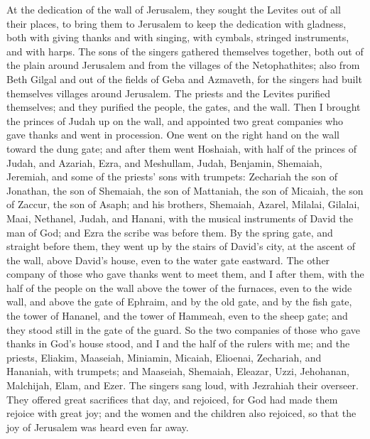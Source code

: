  At the dedication of the wall of Jerusalem, they sought
the Levites out of all their places, to bring them to Jerusalem to keep
the dedication with gladness, both with giving thanks and with singing,
with cymbals, stringed instruments, and with harps.  The
sons of the singers gathered themselves together, both out of the plain
around Jerusalem and from the villages of the Netophathites;
 also from Beth Gilgal and out of the fields of Geba and
Azmaveth, for the singers had built themselves villages around
Jerusalem.  The priests and the Levites purified
themselves; and they purified the people, the gates, and the wall.
 Then I brought the princes of Judah up on the wall, and
appointed two great companies who gave thanks and went in procession.
One went on the right hand on the wall toward the dung gate;
 and after them went Hoshaiah, with half of the princes
of Judah,  and Azariah, Ezra, and Meshullam,
 Judah, Benjamin, Shemaiah, Jeremiah,  and
some of the priests' sons with trumpets: Zechariah the son of Jonathan,
the son of Shemaiah, the son of Mattaniah, the son of Micaiah, the son
of Zaccur, the son of Asaph;  and his brothers, Shemaiah,
Azarel, Milalai, Gilalai, Maai, Nethanel, Judah, and Hanani, with the
musical instruments of David the man of God; and Ezra the scribe was
before them.  By the spring gate, and straight before
them, they went up by the stairs of David's city, at the ascent of the
wall, above David's house, even to the water gate eastward.
 The other company of those who gave thanks went to meet
them, and I after them, with the half of the people on the wall above
the tower of the furnaces, even to the wide wall,  and
above the gate of Ephraim, and by the old gate, and by the fish gate,
the tower of Hananel, and the tower of Hammeah, even to the sheep gate;
and they stood still in the gate of the guard.  So the
two companies of those who gave thanks in God's house stood, and I and
the half of the rulers with me;  and the priests,
Eliakim, Maaseiah, Miniamin, Micaiah, Elioenai, Zechariah, and Hananiah,
with trumpets;  and Maaseiah, Shemaiah, Eleazar, Uzzi,
Jehohanan, Malchijah, Elam, and Ezer. The singers sang loud, with
Jezrahiah their overseer.  They offered great sacrifices
that day, and rejoiced, for God had made them rejoice with great joy;
and the women and the children also rejoiced, so that the joy of
Jerusalem was heard even far away.

